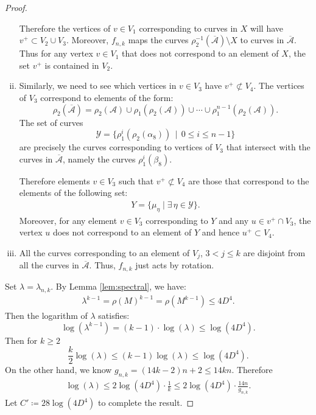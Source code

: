 \begin{proof}
\begin{enumerate}[(i)]
  Therefore the vertices of $v\in V_1$ corresponding to curves in $X$ will have
  $v^+ \subset V_2 \cup V_3.$  Moreover, $f_{n,k}$ maps the curves $\rho_2^{-1}(\overline{\mathcal{A}})\setminus X$ to curves in $\overline{\mathcal{A}}$.  Thus for any vertex $v\in V_1$ that does not correspond to an element of $X$, the set $v^+$ is contained in $V_2$.
\item  Similarly, we need to see which vertices in $v \in V_3$ have $v^+ \not\subset V_4$.  The vertices of $V_3$ correspond to elements of the form:
$$\rho_2(\overline{\mathcal{A}})=\rho_2(\mathcal{A})\cup\rho_1(\rho_2(\mathcal{A}))\cup\cdots\cup\rho_1^{n-1}(\rho_2(\mathcal{A})).$$
 The set of curves 
 $$\mathcal{Y}=\{\rho_1^i(\rho_2(\alpha_8))\,\mid\,0\leq i\leq n-1\}$$ are precisely the curves corresponding to vertices of $V_3$ that intersect with the curves in $\overline{\mathcal{A}}$, namely the curves
  $\rho_1^i(\beta_8)$.

Therefore elements $v \in V_3$ such that $v^+ \not\subset V_4$ are those that correspond to the elements of
  the following set:
  \begin{align*}
    Y = \{\mu_\eta \mid \exists \,\eta\in\mathcal{Y}\}.
  \end{align*}
  Moreover, for any element $v \in V_3$ corresponding to $Y$ and any
  $u \in v^+ \cap V_3$, the vertex $u$ does not correspond to an element of $Y$ and hence $u^+ \subset V_4$.
\item All the curves corresponding to an element of $V_j$, $3 < j \leq k$ are disjoint from all the curves in
  $\overline{\mathcal{A}}$. Thus, $f_{n,k}$ just acts by rotation.
\end{enumerate}

Set $\lambda = \lambda_{n,k}$.  By Lemma \ref{lem:spectral}, we have:
\begin{gather*}
    \lambda^{k-1} = \rho(M)^{k-1} = \rho(M^{k-1}) \leq 4D^4. 
\end{gather*}
Then the logarithm of $\lambda$ satisfies:
$$\log(\lambda^{k-1})=(k-1)\cdot \log(\lambda) \leq \log(4D^4).$$
Then for $k\geq 2$
    $$\frac{k}{2}\log(\lambda) \leq (k-1)\log(\lambda) \leq \log(4D^4).$$
On the other hand, we know $g_{n,k} = (14k - 2)n + 2 \leq 14kn$. Therefore
\begin{align*}
    \log(\lambda) \leq 2\log(4D^4)\cdot\frac{1}{k} \leq 2\log(4D^4)\cdot \frac{14n}{g_{n,k}}.
\end{align*}
Let $C' \coloneqq 28\log(4D^4)$ to complete the result.
\end{proof}

